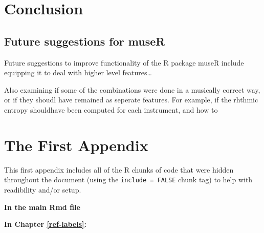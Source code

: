 \documentclass[12pt,twoside]{reedthesis}
\theoremstyle{definition}
\theoremstyle{definition}
\theoremstyle{definition}
\theoremstyle{remark}
\begin{document}
\chapter*{Conclusion}\label{conclusion}

\section{Future suggestions for
museR}\label{future-suggestions-for-muser}

Future suggestions to improve functionality of the R package museR
include equipping it to deal with higher level features\ldots{}

Also examining if some of the combinations were done in a musically
correct way, or if they shoudl have remained as seperate features. For
example, if the rhthmic entropy shouldhave been computed for each
instrument, and how to

\appendix

\chapter{The First Appendix}\label{the-first-appendix}

This first appendix includes all of the R chunks of code that were
hidden throughout the document (using the \texttt{include\ =\ FALSE}
chunk tag) to help with readibility and/or setup.

\textbf{In the main Rmd file}
\begin{Shaded}
\begin{Highlighting}[]
\NormalTok{(}\OperatorTok{!}
  \NormalTok{(}\NormalTok{, } \NormalTok{)}
\NormalTok{(}\OperatorTok{!}
\OperatorTok{::}\NormalTok{(}\NormalTok{)}
\end{Highlighting}
\end{Shaded}
\textbf{In Chapter \ref{ref-labels}:}
\end{document}
